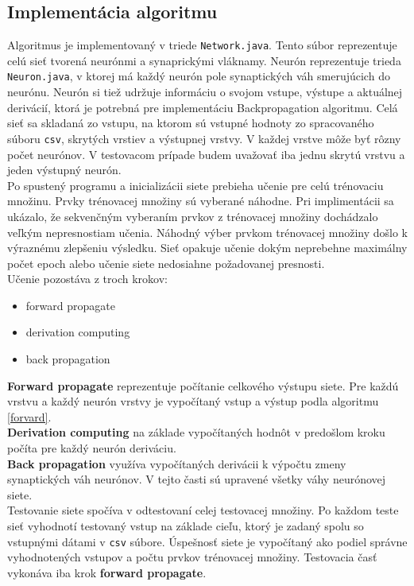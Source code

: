 \documentclass[a4paper, 11pt]{article}
\begin{document}
\subsection{Implementácia algoritmu}
Algoritmus je implementovaný v triede \texttt{Network.java}. Tento súbor reprezentuje celú sieť tvorená neurónmi a synaprickými vláknamy. Neurón reprezentuje trieda \texttt{Neuron.java}, v ktorej má každý neurón pole synaptických váh smerujúcich do neurónu. Neurón si tiež udržuje informáciu o svojom vstupe, výstupe a aktuálnej derivácií, ktorá je potrebná pre implementáciu Backpropagation algoritmu.
Celá sieť sa skladaná zo vstupu, na ktorom sú vstupné hodnoty zo spracovaného súboru \texttt{csv}, skrytých vrstiev a výstupnej vrstvy. V každej vrstve môže byť rôzny počet neurónov. V testovacom prípade budem uvažovať iba jednu skrytú vrstvu a jeden výstupný neurón.\\
Po spustený programu a inicializácii siete prebieha učenie pre celú trénovaciu množinu. Prvky trénovacej množiny sú vyberané náhodne. Pri implimentácii sa ukázalo, že sekvenčným vyberaním prvkov z trénovacej množiny dochádzalo veľkým nepresnostiam učenia. Náhodný výber prvkom trénovacej množiny došlo k výraznému zlepšeniu výsledku. Sieť opakuje učenie dokým neprebehne maximálny počet epoch alebo učenie siete nedosiahne požadovanej presnosti.\\
Učenie pozostáva z troch krokov:
\begin{itemize}
\item forward propagate
\item derivation computing
\item back propagation
\end{itemize}
\textbf{Forward propagate} reprezentuje počítanie celkového výstupu siete. Pre každú vrstvu a každý neurón vrstvy je vypočítaný vstup a výstup podla algoritmu \ref{forvard}.\\
\textbf{Derivation computing} na základe vypočítaných hodnôt v predošlom kroku počíta pre každý neurón deriváciu.\\
\textbf{Back propagation} využíva vypočítaných derivácii k výpočtu zmeny synaptických váh neurónov. V tejto časti sú upravené všetky váhy neurónovej siete.\\  
Testovanie siete spočíva v odtestovaní celej testovacej množiny. Po každom teste sieť vyhodnotí testovaný vstup na základe cieľu, ktorý je zadaný spolu so vstupnými dátami v \texttt{csv} súbore. Úspešnosť siete je vypočítaný ako podiel správne vyhodnotených vstupov a počtu prvkov trénovacej množiny. Testovacia časť vykonáva iba krok \textbf{forward propagate}.  
\end{document}
